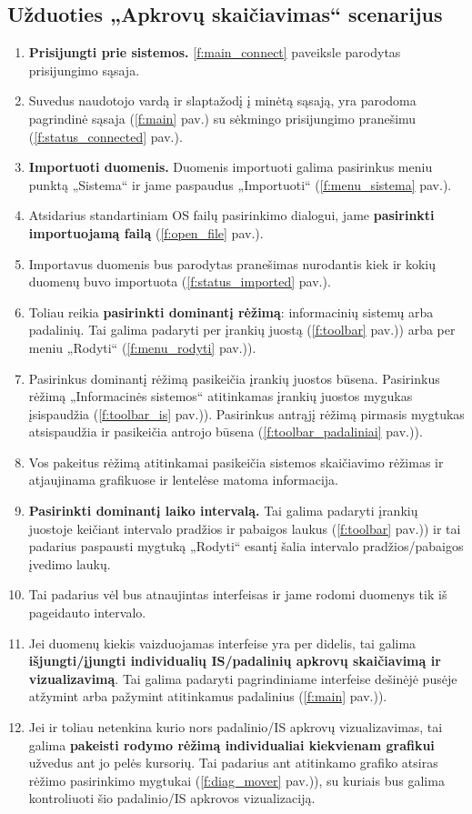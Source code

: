\subsection{Užduoties „Apkrovų skaičiavimas“ scenarijus}

\newcommand{\ri}[1]{(\ref{#1} pav.)}

\begin{enumerate}
  \item \textbf{Prisijungti prie sistemos.} \ref{f:main_connect} paveiksle 
    parodytas prisijungimo sąsaja.
  \item Suvedus naudotojo vardą ir slaptažodį į minėtą sąsają,
    yra parodoma pagrindinė sąsaja \ri{f:main} su sėkmingo 
    prisijungimo pranešimu \ri{f:status_connected}.
  \item \textbf{Importuoti duomenis.} Duomenis importuoti galima
    pasirinkus meniu punktą „Sistema“ ir jame paspaudus
    „Importuoti“ \ri{f:menu_sistema}.
  \item Atsidarius standartiniam OS failų pasirinkimo dialogui, jame
    \textbf{pasirinkti importuojamą failą} \ri{f:open_file}.
  \item Importavus duomenis bus parodytas pranešimas nurodantis kiek ir
    kokių duomenų buvo importuota \ri{f:status_imported}.
  \item Toliau reikia \textbf{pasirinkti dominantį rėžimą}: informacinių sistemų arba padalinių. Tai galima padaryti per įrankių juostą \ri{f:toolbar}) arba per meniu „Rodyti“ \ri{f:menu_rodyti}).
  \item Pasirinkus dominantį rėžimą pasikeičia įrankių juostos būsena. Pasirinkus rėžimą „Informacinės sistemos“ atitinkamas įrankių juostos mygukas įsispaudžia \ri{f:toolbar_is}). Pasirinkus antrąjį rėžimą pirmasis mygtukas atsispaudžia ir pasikeičia antrojo būsena \ri{f:toolbar_padaliniai}).
  \item Vos pakeitus rėžimą atitinkamai pasikeičia sistemos skaičiavimo rėžimas ir atjaujinama grafikuose ir lentelėse matoma informacija.
  \item \textbf{Pasirinkti dominantį laiko intervalą.} Tai galima padaryti įrankių juostoje keičiant intervalo pradžios ir pabaigos laukus \ri{f:toolbar}) ir tai padarius paspausti mygtuką „Rodyti“ esantį šalia intervalo pradžios/pabaigos įvedimo laukų.
  \item Tai padarius vėl bus atnaujintas interfeisas ir jame rodomi duomenys tik iš pageidauto intervalo.
  \item Jei duomenų kiekis vaizduojamas interfeise yra per didelis, tai galima \textbf{išjungti/įjungti individualių IS/padalinių apkrovų skaičiavimą ir vizualizavimą}. Tai galima padaryti pagrindiniame interfeise dešinėjė pusėje atžymint arba pažymint atitinkamus padalinius \ri{f:main}).
  \item Jei ir toliau netenkina kurio nors padalinio/IS apkrovų vizualizavimas, tai galima \textbf{pakeisti rodymo rėžimą individualiai kiekvienam grafikui} užvedus ant jo pelės kursorių. Tai padarius ant atitinkamo grafiko atsiras rėžimo pasirinkimo mygtukai \ri{f:diag_mover}), su kuriais bus galima kontroliuoti šio padalinio/IS apkrovos vizualizaciją.
\end{enumerate}


